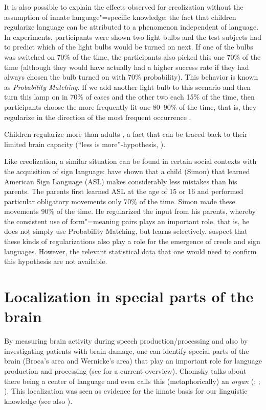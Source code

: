 It is also possible to explain the effects observed for creolization without the assumption of innate language"=specific knowledge:
the fact that children regularize language can be attributed to a phenomenon independent of language. In experiments, participants were shown two
light bulbs and the test subjects had to predict which of the light bulbs would be turned on next. If one of the bulbs was switched on 70\% of the
time, the participants also picked this one 70\% of the time (although they would have actually had a higher success rate if they had always chosen
the bulb turned on with 70\% probability). This behavior is known as \emph{Probability Matching}. If we add another light bulb to this scenario and then turn this lamp on in 70\% of cases and the other two each 
15\% of the time, then participants choose the more frequently lit one 80--90\% of the time, that is, they regularize in the direction of
the most frequent occurrence \citep{Gardener57a,Weir64a}.

Children regularize more than adults \citep{HudsonN99a,HKN2005a}, a fact that can be traced back to their
limited brain capacity (``less is more''-hypothesis, \citealp{Newport90a,Elman93a}). 

Like creolization, a similar situation can be found in certain social contexts with the acquisition of sign language:
\citet{SN2004a} have shown that a child (Simon) that learned American Sign Language (ASL) makes considerably
less mistakes than his parents. The parents first learned ASL at the age of 15 or 16 and performed particular obligatory movements only
70\% of the time. Simon made these movements 90\% of the time. He regularized the input from his parents, whereby the consistent use
of form"=meaning pairs plays an important role, that is, he does not simply use Probability Matching, but learns selectively.
 \citet[]{SN2004a} suspect that these kinds of regularizations also play a role for the emergence of creole and sign languages.
However, the relevant statistical data that one would need to confirm this hypothesis are not available.


\section{Localization in special parts of the brain}

By measuring brain activity during speech production/processing and also by investigating patients with brain damage, one can identify
special parts of the brain (Broca's area and
Wernicke's area) that play an important role for language production and processing (see  for a current overview).
Chomsky talks about there being a center of language and even calls this (metaphorically) an
\emph{organ} (\citealp[]{Chomsky77c-u}; \citealp[]{Chomsky2005a}; \citealp[]{Chomsky2008a}).
This localization was seen as evidence for the innate basis for our linguistic knowledge (see also \citealp[--314]{Pinker94a}). 

